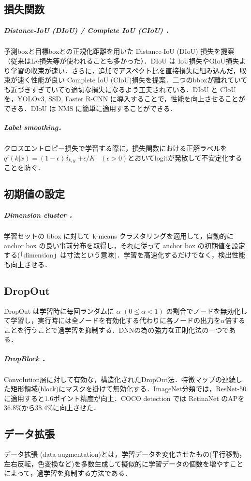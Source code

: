 \documentclass[twocolumn]{jsarticle} %
\begin{document}
\subsection{損失関数}
\subparagraph{Distance-IoU (DIoU) / Complete IoU (CIoU) \cite{ZWLLYR20}．} \label{sec:CIoU} 予測boxと目標boxとの正規化距離を用いた Distance-IoU (DIoU) 損失を提案（従来はL$n$損失等が使われることも多かった）．DIoU は IoU損失やGIoU損失より学習の収束が速い．さらに，追加でアスペクト比を直接損失に組み込んだ，収束が速く性能が良い Complete IoU (CIoU)損失を提案．二つのbboxが離れていても近づきすぎていても適切な損失になるよう工夫されている．DIoU と CIoU を，YOLOv3, SSD\cite{LAESRFB16}, Faster R-CNN に導入することで，性能を向上させることができる．DIoU は NMS に簡単に適用することができる．

\subparagraph{Label smoothing\cite{SVISW16}．} \label{sec:label_smooth}
クロスエントロピー損失で学習する際に，損失関数における正解ラベルを $q'(k|x){=}(1{-}\epsilon)\delta_{k,y}$ 
${+}\epsilon/K$ \ $(\epsilon{>}0)$とおいてlogitが発散して不安定化することを防ぐ．

\subsection{初期値の設定}
\subparagraph{Dimension cluster \cite{RedFar17}．} 学習セットの bbox に対して k-means クラスタリングを適用して，自動的に anchor box の良い事前分布を取得し，それに従って anchor box の初期値を設定する(「dimension」は寸法という意味)．学習を高速化するだけでなく，検出性能も向上させる．

\subsection{DropOut}
DropOut\cite{SHKSS14} は学習時に毎回ランダムに $\alpha$ $(0\leq\alpha<1)$ の割合でノードを無効化して学習し，実行時には全ノードを有効化する代わりに各ノードの出力を$\alpha$倍することを行うことで過学習を抑制する．DNNの為の強力な正則化法の一つである．

\subparagraph{DropBlock \cite{GLL18}．} \label{sec:DropBlock} Convolution層に対して有効な，構造化されたDropOut法．特徴マップの連続した矩形領域(block)にマスクを掛けて無効化する．ImageNet分類では，ResNet-50 に適用すると1.6ポイント精度が向上．COCO detection では RetinaNet のAPを36.8\%から38.4\%に向上させた．

\subsection{データ拡張}
データ拡張 (data augmentation)\cite{KSH12}とは，学習データを変化させたもの(平行移動，左右反転，色変換など)を多数生成して擬似的に学習データの個数を増やすことによって，過学習を抑制する方法である．
\end{document}
